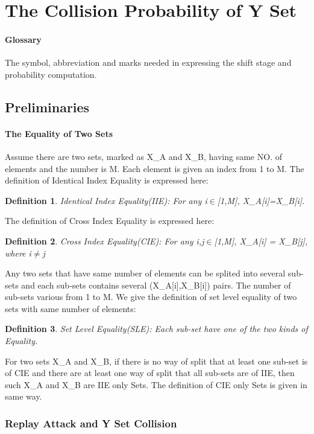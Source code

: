 \documentclass{article}
\newtheorem{defination}{Definition}[section]
\begin{document}
 
\section{The Collision Probability of Y Set}
\paragraph{Glossary} The symbol, abbreviation and marks needed in
expressing the shift stage and probability computation.

\subsection{Preliminaries}
\paragraph{The Equality of Two Sets}
Assume there are two sets, marked as X\_A and X\_B, having same NO. of elements and the number is M. Each element is given an index from 1 to M. The definition of Identical Index Equality is expressed here:
\begin{defination}
Identical Index Equality(IIE): For any i$\in$[1,M], X\_A[i]=X\_B[i].
\end{defination}
The definition of Cross Index Equality is expressed here:
\begin{defination}
Cross Index Equality(CIE): For any i,j$\in$[1,M], X\_A[i] = X\_B[j], where i$\neq$j
\end{defination}
Any two sets that have same number of elements can be splited into several sub-sets and each sub-sets contains several (X\_A[i],X\_B[i]) pairs. The number of sub-sets various from 1 to M. We give the definition of set level equality of two sets with same number of elements:
\begin{defination}
Set Level Equality(SLE): Each sub-set have one of the two kinds of Equality.
\end{defination}
For two sets X\_A and X\_B, if there is no way of split that at least one sub-set is of CIE and there are at least one way of split that all sub-sets are of IIE, then such X\_A and X\_B are IIE only Sets. 
The definition of CIE only Sets is given in same way.

\subsubsection{Replay Attack and Y Set Collision}
\end{document}
